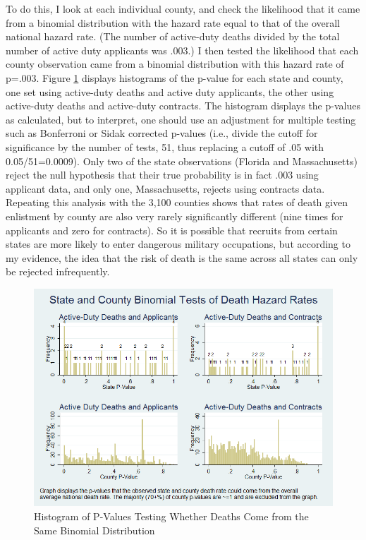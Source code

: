 \documentclass[12pt] {article}
\begin{document}
To do this, I look at each individual county, and check the likelihood that it came from a binomial distribution with the hazard rate equal to that of the overall national hazard rate. (The number of active-duty deaths divided by the total number
of active duty applicants was .003.) I then tested the likelihood
that each county observation came from a binomial distribution with this
hazard rate of p=.003. Figure \ref{Flo:Pat's Histo} displays
histograms of the p-value for each state and county, one set using active-duty deaths
and active duty applicants, the other using active-duty deaths and
active-duty contracts. The histogram displays the p-values as calculated,
but to interpret, one should use an adjustment for multiple testing such as Bonferroni or Sidak corrected p-values (i.e., divide the cutoff for significance by the number of tests, 51, thus replacing a cutoff of .05 with 0.05/51=0.0009). Only two
of the state observations (Florida and Massachusetts) reject the null
hypothesis that their true probability is in fact .003 using applicant
data, and only one, Massachusetts, rejects using contracts data. Repeating this analysis with the 3,100 counties shows that rates of death given enlistment by county are also very rarely significantly different (nine times for applicants and zero for contracts). So it is possible that recruits from certain states are more likely to
enter dangerous military occupations, but according to my evidence,
the idea that the risk of death is the same across all states can
only be rejected infrequently. 

\begin{figure}
\includegraphics[scale=0.6]{../Output/hist_binomial_combined.png}
\caption{Histogram of P-Values Testing Whether Deaths Come from the
Same Binomial Distribution}
\label{Flo:Pat's Histo}
\end{figure}
\clearpage{}
\end{document}
